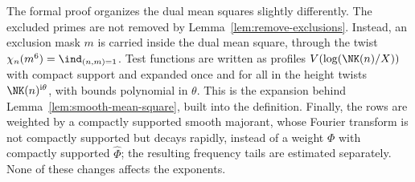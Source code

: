 \begin{remark}\label{rem:formal-dual}
The formal proof organizes the dual mean squares slightly differently. The excluded primes are
not removed by Lemma~\ref{lem:remove-exclusions}. Instead, an exclusion mask $m$ is carried
inside the dual mean square, through the twist $\chi_n(m^6)=\ind_{(n,m)=1}$. Test functions are
written as profiles $V(\log(\NK(n)/X))$ with compact support and expanded once and for all in
the height twists $\NK(n)^{\mathrm i\theta}$, with bounds polynomial in $\theta$. This is the
expansion behind Lemma~\ref{lem:smooth-mean-square}, built into the definition. Finally, the
rows are weighted by a compactly supported smooth majorant, whose Fourier transform is not
compactly supported but decays rapidly, instead of a weight $\Phi$ with compactly supported
$\widehat\Phi$; the resulting frequency tails are estimated separately. None of these changes affects the exponents.
\end{remark}

